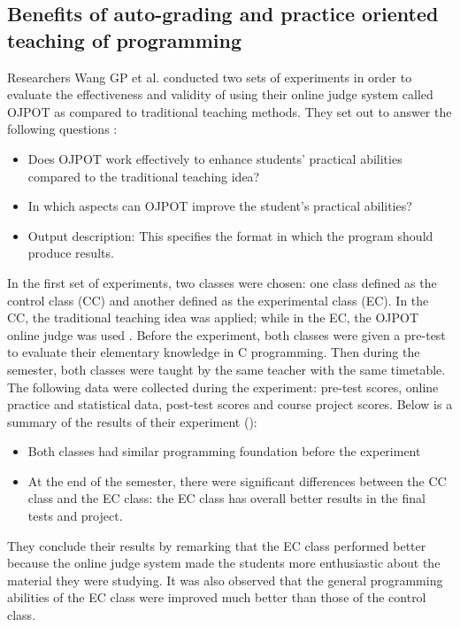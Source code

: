 \documentclass[12pt]{article}
\begin{document}
	\subsection{Benefits of auto-grading and practice oriented teaching of programming}
		Researchers Wang GP et al. conducted two sets of experiments \cite{ojpot} in order to evaluate the effectiveness and validity of using their online judge system called OJPOT as compared to traditional teaching methods. They set out to answer the following questions \cite{ojpot}:
		\begin{itemize}
			\item  Does OJPOT work effectively to enhance students' practical abilities compared to the
					traditional teaching idea?
			\item  In which aspects can OJPOT improve the student's practical abilities?
			\item Output description: This specifies the format in which the program should produce results.
		\end{itemize}
		In the first set of experiments, two classes were chosen: one class defined as the control class (CC) and another defined as the experimental class (EC). In the CC, the traditional teaching idea was applied; while in the EC, the OJPOT online judge was used \cite{ojpot}. Before the experiment, both classes were given a pre-test to evaluate their elementary knowledge in C programming. Then during the semester, both classes were taught by the same teacher with the same timetable. The following data were collected during the experiment: pre-test scores, online practice and statistical data, post-test scores and course project scores. Below is a summary of the results of their experiment (\cite{ojpot}):
		\begin{itemize}
			\item Both classes had similar programming foundation before the experiment
			\item At the end of the semester, there were significant differences between the CC class and
				the EC class: the EC class has overall better results in the final tests and project.
		\end{itemize}
		They conclude their results by remarking that the EC class performed better because the online
	judge system made the students more enthusiastic about the material they were studying. It was
	also observed that the general programming abilities of the EC class were improved much better
	than those of the control class. 
	
\end{document}
